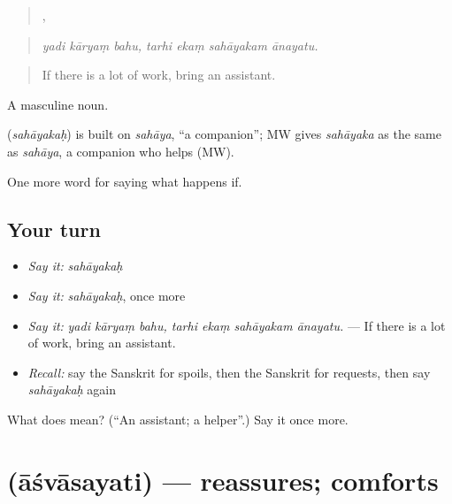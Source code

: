 \begin{quote}
  ,    
\end{quote}

\begin{quote}
\emph{yadi kāryaṃ bahu, tarhi ekaṃ sahāyakam ānayatu.}
\end{quote}

\begin{quote}
If there is a lot of work, bring an assistant.
\end{quote}

A masculine noun.

\begin{cousinweb}
\textbf{} (\emph{sahāyakaḥ}) is built on \emph{sahāya}, \textquotedblleft{}a companion\textquotedblright{}; MW gives \emph{sahāyaka} as the same as \emph{sahāya}, a companion who helps (MW).
\end{cousinweb}

\begin{grammarlens}[title={What you've built}]
One more word for saying what happens if.
\end{grammarlens}

\subsection*{Your turn}
\begin{itemize}
\raggedright
  \item \emph{Say it:} \emph{sahāyakaḥ}
  \item \emph{Say it:} \emph{sahāyakaḥ}, once more
  \item \emph{Say it:} \emph{yadi kāryaṃ bahu, tarhi ekaṃ sahāyakam ānayatu.} — If there is a lot of work, bring an assistant.
  \item \emph{Recall:} say the Sanskrit for spoils, then the Sanskrit for requests, then say \emph{sahāyakaḥ} again
\end{itemize}

\begin{tcolorbox}[breakable,colback=teal!4,colframe=teal!35!black,title={Before you move on}]
What does  mean? (\textquotedblleft{}An assistant; a helper\textquotedblright{}.) Say it once more.
\end{tcolorbox}
\section[\texorpdfstring{\sk{आश्वासयति} (āśvāsayati)}{आश्वासयति (āśvāsayati)}]{ (āśvāsayati) — reassures; comforts}

